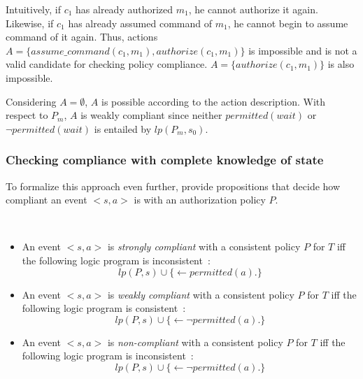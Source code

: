 Intuitively, if $c_1$ has already authorized $m_1$, he cannot authorize it again.
Likewise, if $c_1$ has already assumed command of $m_1$, he cannot begin to assume command of it again.
Thus, actions $A = \{assume\_command(c_1, m_1), authorize(c_1, m_1)\}$ is impossible and is not a valid candidate for checking policy compliance.
$A = \{authorize(c_1, m_1)\}$ is also impossible.

Considering $A=\emptyset$, $A$ is possible according to the action description.
With respect to $P_m$, $A$ is weakly compliant since neither $permitted(wait)$ or $\neg permitted(wait)$ is entailed by $lp(P_m, s_0)$.

\subsubsection{Checking compliance with complete knowledge of state}

To formalize this approach even further, \citet{gelfond_authorization_2008} provide propositions that decide how compliant an event $<s,a>$ is with an authorization policy $P$.

\begin{definition}
    \label{def:authorization_event_compliance_full_knowledge}
    ~

    \begin{itemize}
        \item An event $<s, a>$ is \textit{strongly compliant} with a consistent policy $P$ for $T$ iff the following logic program is inconsistent~\citep{gelfond_authorization_2008}:
            \begin{equation}
                lp(P, s) \cup \{ \leftarrow permitted(a). \}
            \end{equation}
        \item An event $<s, a>$ is \textit{weakly compliant} with a consistent policy $P$ for $T$ iff the following logic program is consistent~\citep{gelfond_authorization_2008}:
            \begin{equation}
                lp(P, s) \cup \{ \leftarrow \neg permitted(a). \}
            \end{equation}
        \item An event $<s, a>$ is \textit{non-compliant} with a consistent policy $P$ for $T$ iff the following logic program is inconsistent~\citep{gelfond_authorization_2008}:
            \begin{equation}
                lp(P, s) \cup \{ \leftarrow \neg permitted(a). \}
            \end{equation}
    \end{itemize}
\end{definition}

